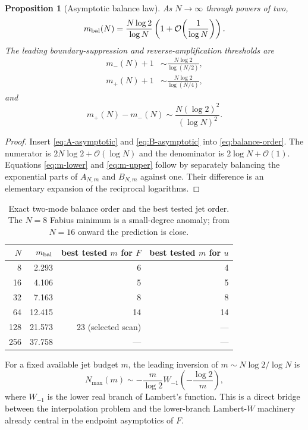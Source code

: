 \documentclass[11pt,oneside]{article}
\numberwithin{equation}{section}
\newtheorem{proposition}[theorem]{Proposition}
\theoremstyle{definition}
\theoremstyle{remark}
\newcommand{\bigO}{\mathcal O}
\begin{document}
\begin{proposition}[Asymptotic balance law]
\label{prop:balance-asymptotic}
As $N\to\infty$ through powers of two,
\begin{equation}
 m_{\rm bal}(N)=\frac{N\log2}{\log N}
 \left(1+\bigO\!\left(\frac1{\log N}\right)\right).
 \label{eq:balance-asymptotic}
\end{equation}
The leading boundary-suppression and reverse-amplification thresholds are
\begin{align}
 m_-(N)+1&\sim\frac{N\log2}{\log(N/2)},
 \label{eq:m-lower}\\
 m_+(N)+1&\sim\frac{N\log2}{\log(N/4)},
 \label{eq:m-upper}
\end{align}
and
\begin{equation}
 m_+(N)-m_-(N)
 \sim\frac{N(\log2)^2}{(\log N)^2}.
 \label{eq:window-width}
\end{equation}
\end{proposition}

\begin{proof}
Insert \eqref{eq:A-asymptotic} and \eqref{eq:B-asymptotic} into
\eqref{eq:balance-order}.  The numerator is $2N\log2+\bigO(\log N)$ and the denominator is
$2\log N+\bigO(1)$.  Equations \eqref{eq:m-lower} and \eqref{eq:m-upper} follow by
separately balancing the exponential parts of $A_{N,m}$ and $B_{N,m}$ against one.  Their
difference is an elementary expansion of the reciprocal logarithms.
\end{proof}

\begin{table}[htbp]
\centering
\caption{Exact two-mode balance order and the best tested jet order.  The $N=8$ Fabius
minimum is a small-degree anomaly; from $N=16$ onward the prediction is close.}
\label{tab:balance}
\begin{tabular}{rrrr}
\toprule
$N$ & $m_{\rm bal}$ & best tested $m$ for $F$ & best tested $m$ for $u$ \\
\midrule
8   & 2.293  & 6  & 4 \\
16  & 4.106  & 5  & 5 \\
32  & 7.163  & 8  & 8 \\
64  & 12.415 & 14 & 14 \\
128 & 21.573 & 23 (selected scan) & --- \\
256 & 37.758 & --- & --- \\
\bottomrule
\end{tabular}
\end{table}

For a fixed available jet budget $m$, the leading inversion of
$m\sim N\log2/\log N$ is
\begin{equation}
 N_{\max}(m)\sim
 -\frac{m}{\log2}
 W_{-1}\!\left(-\frac{\log2}{m}\right),
 \label{eq:lambert-budget}
\end{equation}
where $W_{-1}$ is the lower real branch of Lambert's function.  This is a direct bridge
between the interpolation problem and the lower-branch Lambert-$W$ machinery already
central in the endpoint asymptotics of $F$.
\end{document}
